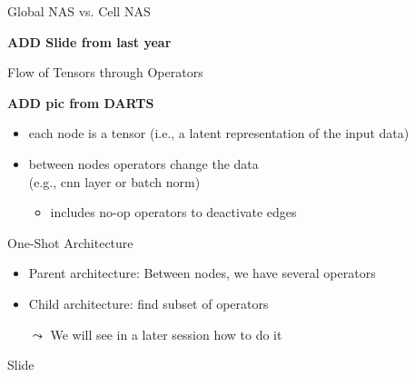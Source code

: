 \begin{frame}[c]{Global NAS vs. Cell NAS}

\textbf{ADD Slide from last year}

\end{frame}
\begin{frame}[c]{Flow of Tensors through Operators}

\textbf{ADD pic from DARTS}

\begin{itemize}
  \item each node is a tensor (i.e., a latent representation of the input data)
  \item between nodes operators change the data\\ (e.g., cnn layer or batch norm)
  \begin{itemize}  
     \item includes no-op operators to deactivate edges
  \end{itemize}
\end{itemize}


\end{frame}
\begin{frame}[c]{One-Shot Architecture}

\begin{itemize}
  \item Parent architecture: Between nodes, we have several operators 
  \item Child architecture: find subset of operators
  \item[$\leadsto$] We will see in a later session how to do it
\end{itemize}

\end{frame}
\begin{frame}[c]{Slide}


\end{frame}
